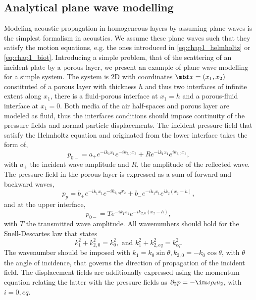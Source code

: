 \subsection{Analytical plane wave modelling}
\label{ssec:GM}

Modeling acoustic propagation in homogeneous layers by assuming plane waves is the simplest formalism in acoustics. We assume these plane waves such that they satisfy the motion equations, e.g. the ones introduced in \cref{eq:chap1_helmholtz} or \cref{eq:chap1_biot}. Introducing a simple problem, that of the scattering of an incident plate by a porous layer, we present an example of plane wave modelling for a simple system. The system is 2D with coordinates $\mbf x = (x_1, x_2)$ constituted of a porous layer with thickness $h$ and thus two interfaces of infinite extent along $x_1$, there is a fluid-porous interface at $x_1 = h$ and a porous-fluid interface at $x_1 = 0$. Both media of the air half-spaces and porous layer are modeled as fluid, thus the interfaces conditions should impose continuity of the pressure fields and normal particle displacements. The incident pressure field that satisfy the Helmholtz equation and originated from the lower interface takes the form of, 
\begin{equation}
    p_{0-} = a_+ e^{-ik_1 x_1} e^{-ik_{2,0} x_2} + R e^{-ik_1 x_1} e^{ik_{2,0} x_2}, 
\end{equation}
with $a_+$ the incident wave amplitude and $R$, the amplitude of the reflected wave. The pressure field in the porous layer is expressed as a sum of forward and backward waves,
\begin{equation}
    p_{p} = b_+ e^{-ik_1 x_1} e^{-ik_{2,eq} x_2} + b_- e^{-ik_1 x_1} e^{ik_2 (x_2-h)},
\end{equation}
and at the upper interface,
\begin{equation}
    p_{0-} = T e^{-ik_1x_1}e^{-ik_{2,0} (x_2-h)},
\end{equation}
with $T$ the transmitted wave amplitude. All wavenumbers should hold for the Snell-Descartes law that states
\begin{equation}
    k_1^2 + k_{2,0}^2 = k_0^2, \,\,\mathrm{ and }\,\, k_1^2 + k_{2,eq}^2 = k_{eq}^2. 
    \label{eq:snell}    
\end{equation}
The wavenumber should be imposed with $k_1 = k_0 \sin{\theta}, k_{2,0} = -k_0 \cos{\theta}$, with $\theta$ the angle of incidence, that governs the direction of propagation of the incident field. The displacement fields are additionally expressed using the momentum equation relating the latter with the pressure fields as $\partial_2 p = -\im \omega \rho_i u_2$, with $i=0, eq$. 


